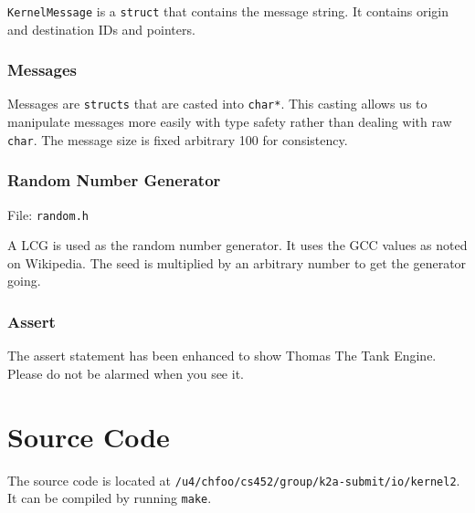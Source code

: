 \documentclass[letterpaper]{article}
\begin{document}
\texttt{KernelMessage} is a \texttt{struct} that contains the message string. It contains origin and destination IDs and pointers.


\subsubsection{Messages%
  \label{messages}%
}

Messages are \texttt{structs} that are casted into \texttt{char*}. This casting allows us to manipulate messages more easily with type safety rather than dealing with raw \texttt{char}. The message size is fixed arbitrary 100 for consistency.


\subsubsection{Random Number Generator%
  \label{random-number-generator}%
}

File: \texttt{random.h}

A LCG is used as the random number generator. It uses the GCC values as noted on Wikipedia. The seed is multiplied by an arbitrary number to get the generator going.


\subsubsection{Assert%
  \label{assert}%
}

The assert statement has been enhanced to show Thomas The Tank Engine. Please do not be alarmed when you see it.


\section{Source Code%
  \label{source-code}%
}

The source code is located at \texttt{/u4/chfoo/cs452/group/k2a-submit/io/kernel2}. It can be compiled by running \texttt{make}.
\end{document}

